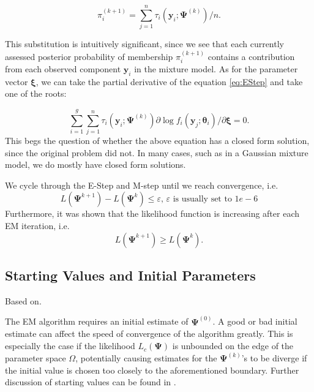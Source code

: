 \documentclass{article}\usepackage[]{graphicx}\usepackage[]{xcolor}
\theoremstyle{plain}
\theoremstyle{definition}
\theoremstyle{remark}
\newcommand{\boldy}{\mathbf{y}}
\newcommand{\boldtheta}{\boldsymbol{\theta}}
\newcommand{\boldPsi}{\boldsymbol{\Psi}}
\newcommand{\boldxi}{\boldsymbol{\xi}}
\begin{document}
\begin{equation}\label{eq:MStep1}
  \pi_i^{(k+1)} = \sum_{j=1}^n \tau_i (\boldy_i ; \boldPsi^{(k)}) / n.
\end{equation}

This substitution is intuitively significant, since we see that each currently assessed posterior probability of membership $\pi_i^{(k+1)}$ contains a contribution from each observed component $\boldy_i$ in the mixture model. As for the parameter vector $\boldxi$, we can take the partial derivative of the equation \eqref{eq:EStep} and take one of the roots:

\begin{equation}\label{eq:MStep2}
  \sum_{i=1}^g \sum_{j=1}^n \tau_i (\boldy_i ; \boldPsi^{(k)}) \partial \log f_i (\boldy_j ; \boldtheta_i) / \partial \boldxi = 0.
\end{equation}
This begs the question of whether the above equation has a closed form solution, since the original problem did not. In many cases, such as in a Gaussian mixture model, we do mostly have closed form solutions.

We cycle through the E-Step and M-step until we reach convergence, i.e.
\begin{equation*}
  L(\boldPsi^{k+1}) - L(\boldPsi^{k}) \leq \varepsilon, \, \varepsilon \text{ is usually set to } 1e-6
\end{equation*}
Furthermore, it was shown that the likelihood function is increasing after each EM iteration, i.e.
\begin{equation}
  L(\boldPsi^{k+1}) \geq L(\boldPsi^{k}).
\end{equation}


\subsection{Starting Values and Initial Parameters}\label{subsec:start}
Based on\cite[Sections 2.10, 2.12]{FMMs_Book}.

The EM algorithm requires an initial estimate of $\boldPsi^{(0)}$. A good or bad initial estimate can affect the speed of convergence of the algorithm greatly. This is especially the case if the likelihood $L_c(\boldPsi)$ is unbounded on the edge of the parameter space $\Omega$, potentially causing estimates for the $\boldPsi^{(k)}$'s to be diverge if the initial value is chosen too closely to the aforementioned boundary. Further discussion  of starting values can be found in \cite[Section 3.8]{FMMs_Book}.
\end{document}
